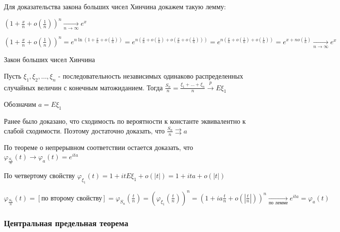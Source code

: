 \documentclass[12pt]{article}
\begin{document}
Для доказательства закона больших чисел Хинчина докажем такую лемму: 

$\left(1 + \frac{x}{n} + o\left(\frac{1}{n}\right)\right)^n \underset{n \to \infty}{\longrightarrow} e^x$

\begin{MyProof}
    $\left(1 + \frac{x}{n} + o\left(\frac{1}{n}\right)\right)^n = e^{n \ln\left(1 + \frac{x}{n} + o\left(\frac{1}{n}\right)\right)} = 
    e^{n \left(\frac{x}{n} + o\left(\frac{1}{n}\right) + o\left(\frac{x}{n} + o\left(\frac{1}{n}\right)\right)\right)} = e^{n\left(\frac{x}{n} + o\left(\frac{1}{n}\right) + o\left(\frac{1}{n}\right)\right)} = e^{x + n o\left(\frac{1}{n}\right)} \underset{n \to \infty}{\longrightarrow} e^x$
\end{MyProof}

\hypertarget{lawofbignumberskhinchin2}{}

\begin{MyTheorem}
    \Ths Закон больших чисел Хинчина

    Пусть $\xi_1, \xi_2, \dots, \xi_n$ - последовательность независимых одинаково распределенных случайных величин с конечным матожиданием.
    Тогда $\frac{S_n}{n} = \frac{\xi_1 + \dots + \xi_n}{n} \overset{p}{\longrightarrow} E\xi_1$
\end{MyTheorem}

\begin{MyProof}
    Обозначим $a = E\xi_1$

    Ранее было доказано, что сходимость по вероятности к константе эквивалентно к слабой сходимости. Поэтому достаточно доказать, что $\frac{S_n}{n} \rightrightarrows a$

    По теореме о непрерывном соответствии остается доказать, что $\varphi_{\frac{S_n}{n}}(t) \longrightarrow \varphi_a(t) = e^{ita}$

    По четвертому свойству $\varphi_{\xi_1}(t) = 1 + itE\xi_1 + o(|t|) = 1 + ita + o(|t|)$

    $\varphi_{\frac{S_n}{n}}(t) = [\text{по второму свойству}] = \varphi_{S_n}\left(\frac{t}{n}\right) = \left(\varphi_{\xi_1}\left(\frac{t}{n}\right)\right)^n = \left(1 + ia\frac{t}{n} + o\left(\left|\frac{t}{n}\right|\right)\right)^n \underset{\text{по лемме}}{\longrightarrow}
    e^{ita} = \varphi_a(t)$
\end{MyProof}

\subsubsection{Центральная предельная теорема}
\end{document}
